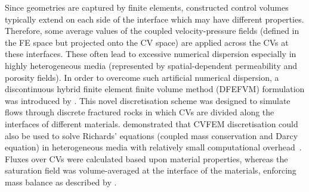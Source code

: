 \documentclass[preprint,authoryear,12pt]{elsarticle}
\newcommand{\KCnote}[1]{\fbox{\parbox{\textwidth}{ \color{black} KC Note $\Rightarrow$ #1}}}
\begin{document}

\medskip
Since geometries are captured by finite elements, constructed control volumes typically extend on each side of the interface which may have different properties. Therefore, some average values of the coupled velocity-pressure fields (defined in the FE space but projected onto the CV space) are applied across the CVs at these interfaces. These often lead to excessive numerical dispersion especially in highly heterogeneous media (represented by spatial-dependent permeability and porosity fields). In order to overcome such artificial numerical dispersion, a discontinuous hybrid finite element finite volume method (DFEFVM) formulation was introduced by \citet{nick_2011b, nick_2011a}. This novel discretisation scheme was designed to simulate flows through discrete fractured rocks in which CVs are divided along the interfaces of different materials. \citet{cumming_2011} demonstrated that CVFEM discretisation could also be used to solve Richards' equations (coupled mass conservation and Darcy equation) in heterogeneous media with relatively small computational overhead~\citep[compared with traditional coupled velocity-pressure based formulations, see also][]{cumming_phd2012}. Fluxes over CVs were calculated based upon material properties, whereas the saturation field was volume-averaged at the interface of the materials, enforcing mass balance as described by \citet{kirkland_1992}.

\end{document}
